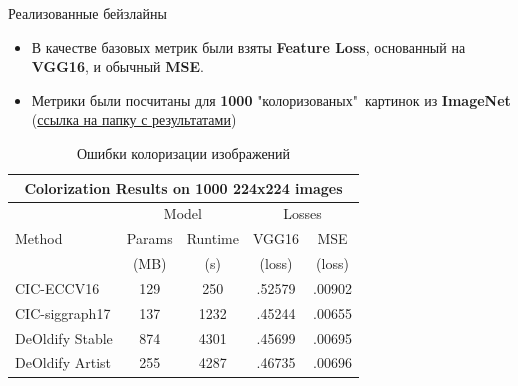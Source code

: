 \documentclass[aspectratio=169]{beamer}
\begin{document}
\begin{frame}{Реализованные бейзлайны}
\begin{itemize}
\item В качестве базовых метрик были взяты \textbf{Feature Loss}, основанный на \textbf{VGG16}, и обычный \textbf{MSE}.
    \item Метрики были посчитаны для \textbf{1000} "колоризованых"\ картинок из \textbf{ImageNet} (\href{https://drive.google.com/drive/folders/1ebPVAsKlLlXY2Tg8Q1TXbiTRhfdegI40}{ссылка на папку с результатами})
\end{itemize}

\begin{table}\bf
    \begin{tabular}{l|c|c|c|c}
    \hline
    \multicolumn{5}{c}{Colorization Results on 1000 224x224 images}\\ 
    \hline
    \hline
    \multirow{3}{*}{Method} & \multicolumn{2}{c|}{Model} &  \multicolumn{2}{c}{Losses}\\
                            & Params & Runtime & VGG16 & MSE \\
                            & (MB) & (s) & (loss) & (loss) \\
    \hline
    CIC-ECCV16 & 129 & 250 & .52579 & .00902\\
    CIC-siggraph17 & 137 & 1232 & .45244 & .00655 \\
    \hline 
    DeOldify Stable & 874 & 4301 & .45699 & .00695\\
    DeOldify Artist & 255 & 4287 & .46735 & .00696\\
    \end{tabular}
    \caption*{Ошибки колоризации изображений}
\end{table}

\end{frame}
\end{document}

